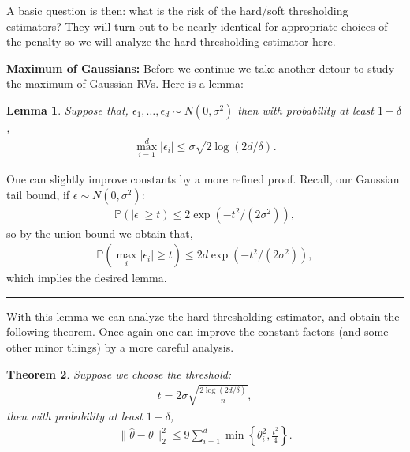 \documentclass[twoside,12pt]{article}
\newcounter{lecnum}
\newtheorem{theorem}{Theorem}[lecnum]
\newtheorem{lemma}[theorem]{Lemma}
\newenvironment{proof}{{\bf Proof:}}{\hfill\rule{2mm}{2mm}}
\begin{document}
A basic question is then: what is the risk of the hard/soft thresholding estimators? They will turn out to be nearly identical for appropriate choices of the penalty so we will analyze the hard-thresholding estimator here.

{\bf Maximum of Gaussians: } Before we continue we take another detour to study the maximum of Gaussian RVs. Here is a lemma:
\begin{lemma}
Suppose that, $\epsilon_1, \ldots, \epsilon_d \sim N(0,\sigma^2)$ then with probability at least $1 - \delta$,
\begin{align*}
\max_{i=1}^d |\epsilon_i| \leq \sigma \sqrt{ 2 \log (2d/\delta) }.
\end{align*}
\end{lemma}

\begin{proof}
One can slightly improve constants by a more refined proof. Recall, our Gaussian tail bound, if $\epsilon \sim N(0,\sigma^2)$: 
\begin{align*}
\mathbb{P}(|\epsilon| \geq t) \leq 2 \exp (- t^2/ (2\sigma^2)),
\end{align*}
so by the union bound we obtain that,
\begin{align*}
\mathbb{P}(\max_i |\epsilon_i| \geq t) \leq 2d \exp (- t^2/ (2\sigma^2)),
\end{align*}
which implies the desired lemma.
\end{proof}


With this lemma we can analyze the hard-thresholding estimator, and obtain the following theorem. Once again one can improve the constant factors (and some other minor things) by a more careful analysis. 
\begin{theorem}
Suppose we choose the threshold:
\begin{align*}
t = 2\sigma \sqrt{ \frac{2 \log(2d/\delta)}{n} },
\end{align*}
then with probability at least $1 - \delta$, 
\begin{align*}
\|\widehat{\theta} - \theta\|_2^2 \leq 9 \sum_{i=1}^d \min\left\{\theta_i^2,\frac{t^2}{4}\right\}.
\end{align*}
\end{theorem}
\end{document}
